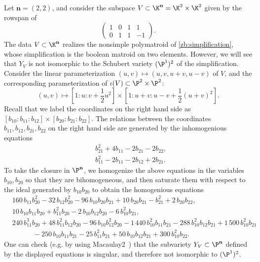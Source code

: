 \begin{exam}
    Let $\mathbf{n} = (2,2)$, and consider the subspace $V \subset \K^{\mathbf{n}} = \K^2 \times \K^2$ given by the rowspan of
    \[
    \begin{pmatrix}
        1 & 0 & 1 & 1\\
        0 & 1 & 1 & -1
    \end{pmatrix}.
    \]
    The data $V \subset \K^{\mathbf{n}}$ realizes the nonsimple polymatroid of \cref{zb:simplification}, whose simplification is the boolean matroid on two elements. However, we will see that $Y_V$ is not isomorphic to the Schubert variety $(\P^1)^2$ of the simplification. Consider the linear parameterization $(u,v) \mapsto (u,v,u+v,u-v)$ of $V$, and the corresponding parameterization of $\iota(V) \subset \P^2 \times \P^2$:
    \[
    (u,v) \mapsto [1:u:v + \frac12 u^2] \times [1:u+v: u-v + \frac12(u+v)^2].
    \]
    Recall that we label the coordinates on the right hand side as $[b_{10}:b_{11}:b_{12}] \times [b_{20}:b_{21}:b_{22}]$. The relations between the coordinates $b_{11},b_{12},b_{21},b_{22}$ on the right hand side are generated by the inhomogenious equations
    \begin{align*}
        &b_{21}^2 + 4b_{11} - 2b_{21} - 2b_{22},\\
        &b_{11}^2 - 2b_{11} - 2b_{12} + 2b_{21}.
    \end{align*}
    To take the closure in $\P^{\mathbf{n}}$, we homogenize the above equations in the variables $b_{10},b_{20}$ so that they are bihomogeneous, and then saturate them with respect to the ideal generated by $b_{10}b_{20}$ to obtain the homogenious equations
    \begin{align*}
        &160\,b_{11}b_{20}^{2}-32\,b_{12}b_{20}^{2}-96\,b_{10}b_{20}b_{21}+10\,b_{20}b_{21}-b_{21}^{2}+2\,b_{20}b_{22},\\
        &10\,b_{10}b_{11}b_{20}+b_{11}^{2}b_{20}-2\,b_{10}b_{12}b_{20}-6\,b_{10}^{2}b_{21},\\
        &240\,b_{11}^{3}b_{20}+48\,b_{11}^{2}b_{12}b_{20}-96\,b_{10}b_{12}^{2}b_{20}-1\,440\,b_{10}^{2}b_{11}b_{21}-288\,b_{10}^{2}b_{12}b_{21}+1\,500\,b_{10}^{2}b_{21}\\
        &\quad\quad\quad-250\,b_{10}b_{11}b_{21}-25\,b_{11}^{2}b_{21}+50\,b_{10}b_{12}b_{21}+300\,b_{10}^{2}b_{22}.
    \end{align*}
    One can check (e.g. by using Macaulay2~\cite{M2}) that the subvariety $Y_V \subset\P^{\mathbf{n}}$ defined by the displayed equations is singular, and therefore not isomorphic to $(\P^1)^2$. 
\end{exam}
